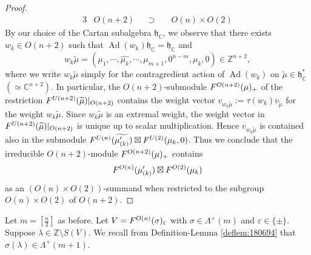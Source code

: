 \begin{proof}
\begin{alignat*}{3}
 &O(n+2) &&\supset\,\, &&O(n) \times O(2)
\end{alignat*}
By our choice of the Cartan subalgebra
 ${\mathfrak{h}}_{\mathbb{C}}$, 
 we observe
 that there exists $w_k \in O(n+2)$
 such that $\operatorname{Ad}(w_k){\mathfrak{h}}_{\mathbb{C}}
={\mathfrak{h}}_{\mathbb{C}}$
 and 
\[
  w_k \widetilde \mu
=(\mu_1, \cdots,\widehat{\mu_k}, \cdots,\mu_{m+1}, 0^{n-m},\mu_k,0) \in 
{\mathbb{Z}}^{n+2}, 
\]
where we write $w_k \widetilde \mu$ simply
 for the contragredient action
 of $\operatorname{Ad}(w_k)$ on $\widetilde \mu \in {\mathfrak{h}}_{\mathbb{C}}^{\ast}$
 $(\simeq {\mathbb{C}}^{n+2})$.  
In particular,
 the $O(n+2)$-submodule
 $F^{{O(n+2)}}({\mu})_+$
 of the restriction $F^{{U(n+2)}}({\widetilde \mu})|_{O(n+2)}$
 contains the weight vector
 $v_{w_k \widetilde \mu}:=\tau(w_k) v_{\widetilde \mu}$
 for the weight $w_k \widetilde \mu$.  
Since $w_k \widetilde \mu$ is an extremal weight, 
 the weight vector in $F^{{U(n+2)}}({\widetilde \mu})|_{O(n+2)}$
 is unique up to scalar multiplication.  
Hence $v_{w_k \widetilde \mu}$ is contained also in the submodule
 $F^{{U(n)}}({\widetilde {\mu_{(k)}'}}) \boxtimes F^{{U(2)}}({\mu_{k},0})$.  
Thus we conclude that the irreducible $O(n+2)$-module
 $F^{{O(n+2)}}({\mu})_+$ contains
\[
   F^{{O(n)}}({\mu_{(k)}'}) \boxtimes F^{{O(2)}}({\mu_k})
\]
 as an $(O(n) \times O(2))$-summand 
 when restricted to the subgroup $O(n) \times O(2)$ of $O(n+2)$.  
\end{proof} 



Let $m=[\frac n 2]$
 as before.  
Let $V=F^{{O(n)}}({\sigma})_{\varepsilon}$
 with $\sigma \in \Lambda^+(m)$
 and $\varepsilon \in \{\pm\}$.  
Suppose $\lambda \in {\mathbb{Z}} \setminus S(V)$.  
We recall from Definition-Lemma \ref{deflem:180694}
 that $\sigma(\lambda) \in \Lambda^+(m+1)$.  

